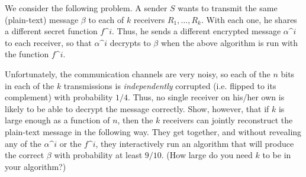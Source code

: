 \documentclass[12pt]{article}
\begin{document}
\begin{enumerate}
We consider the following problem.
A sender $S$ wants to transmit the same (plain-text) message $\beta$
to each of $k$ receivers $R_1, \ldots, R_k$.
With each one, he shares a different secret function $f\^i$.
Thus, he sends a different encrypted message $\alpha\^i$ to each
receiver, so that $\alpha\^i$ decrypts to $\beta$ when the
above algorithm is run with the function $f\^i$.

Unfortunately, the communication channels are very noisy, so
each of the $n$ bits in each of the $k$ transmissions is
{\em independently} corrupted (i.e. flipped to its complement)
with probability $1/4$.
Thus, no single receiver on his/her own is likely to be able to decrypt
the message correctly.
Show, however, that if $k$ is large enough as a function of $n$,
then the $k$ receivers can jointly reconstruct the plain-text message
in the following way.
They get together, and without revealing any of the $\alpha\^i$
or the $f\^i$, they interactively run an algorithm
that will produce the correct $\beta$ with probability at least $9/10$.
(How large do you need $k$ to be in your algorithm?)

\end{enumerate}
\end{document}
